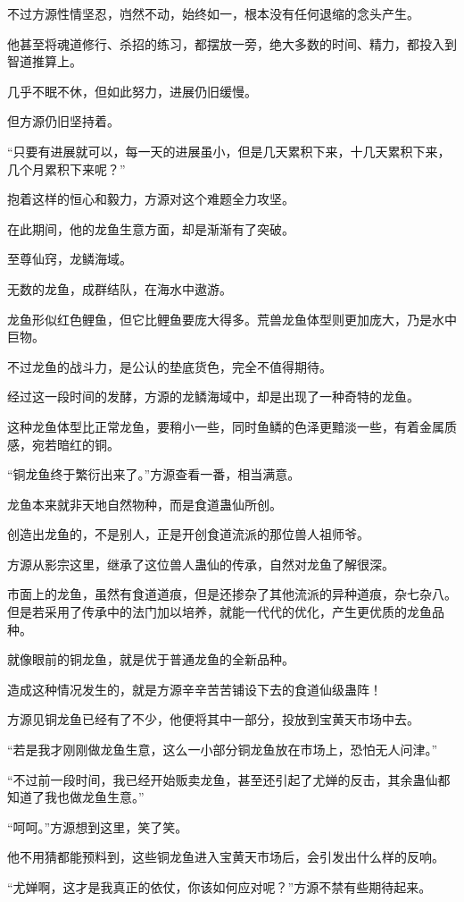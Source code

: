 \begin{this_body}
不过方源性情坚忍，岿然不动，始终如一，根本没有任何退缩的念头产生。

他甚至将魂道修行、杀招的练习，都摆放一旁，绝大多数的时间、精力，都投入到智道推算上。

几乎不眠不休，但如此努力，进展仍旧缓慢。

但方源仍旧坚持着。

“只要有进展就可以，每一天的进展虽小，但是几天累积下来，十几天累积下来，几个月累积下来呢？”

抱着这样的恒心和毅力，方源对这个难题全力攻坚。

在此期间，他的龙鱼生意方面，却是渐渐有了突破。

至尊仙窍，龙鳞海域。

无数的龙鱼，成群结队，在海水中遨游。

龙鱼形似红色鲤鱼，但它比鲤鱼要庞大得多。荒兽龙鱼体型则更加庞大，乃是水中巨物。

不过龙鱼的战斗力，是公认的垫底货色，完全不值得期待。

经过这一段时间的发酵，方源的龙鳞海域中，却是出现了一种奇特的龙鱼。

这种龙鱼体型比正常龙鱼，要稍小一些，同时鱼鳞的色泽更黯淡一些，有着金属质感，宛若暗红的铜。

“铜龙鱼终于繁衍出来了。”方源查看一番，相当满意。

龙鱼本来就非天地自然物种，而是食道蛊仙所创。

创造出龙鱼的，不是别人，正是开创食道流派的那位兽人祖师爷。

方源从影宗这里，继承了这位兽人蛊仙的传承，自然对龙鱼了解很深。

市面上的龙鱼，虽然有食道道痕，但是还掺杂了其他流派的异种道痕，杂七杂八。但是若采用了传承中的法门加以培养，就能一代代的优化，产生更优质的龙鱼品种。

就像眼前的铜龙鱼，就是优于普通龙鱼的全新品种。

造成这种情况发生的，就是方源辛辛苦苦铺设下去的食道仙级蛊阵！

方源见铜龙鱼已经有了不少，他便将其中一部分，投放到宝黄天市场中去。

“若是我才刚刚做龙鱼生意，这么一小部分铜龙鱼放在市场上，恐怕无人问津。”

“不过前一段时间，我已经开始贩卖龙鱼，甚至还引起了尤婵的反击，其余蛊仙都知道了我也做龙鱼生意。”

“呵呵。”方源想到这里，笑了笑。

他不用猜都能预料到，这些铜龙鱼进入宝黄天市场后，会引发出什么样的反响。

“尤婵啊，这才是我真正的依仗，你该如何应对呢？”方源不禁有些期待起来。

\end{this_body}


